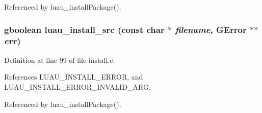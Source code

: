 Referenced by luau\_\-install\-Package().
\subsubsection{\setlength{\rightskip}{0pt plus 5cm}gboolean luau\_\-install\_\-src (const char $\ast$ {\em filename}, GError $\ast$$\ast$ {\em err})}\label{install_8h_a2}




Definition at line 99 of file install.c.

References LUAU\_\-INSTALL\_\-ERROR, and LUAU\_\-INSTALL\_\-ERROR\_\-INVALID\_\-ARG.

Referenced by luau\_\-install\-Package().